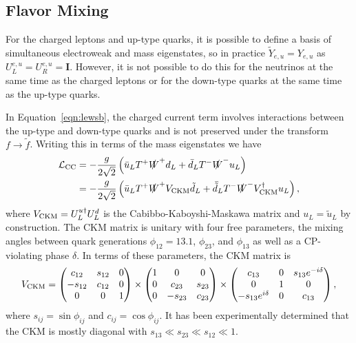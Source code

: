 \subsection{Flavor Mixing}

For the charged leptons and up-type quarks, it is possible to define a basis of simultaneous electroweak and mass eigenstates, so in practice $\tilde Y_{e,u} = Y_{e,u}$ as $U^{e,u}_L = U^{e,u}_R = \mathit{\mathbf{I}}$.
However, it is not possible to do this for the neutrinos at the same time as the charged leptons or for the down-type quarks at the same time as the up-type quarks.

In Equation~\ref{eqn:lewsb}, the charged current term involves interactions between the up-type and down-type quarks and is not preserved under the transform $f \rightarrow \tilde f$.
Writing this in terms of the mass eigenstates we have
\begin{align}
  \mathcal{L}_{\text{CC}} %
  & = - \frac{g}{2\sqrt{2}} \left( \bar u_L T^+ \slashed W^+ d_L + \bar d_L T^- \slashed W^- u_L \right) \nonumber \\
  & = - \frac{g}{2\sqrt{2}} \left( \bar{u}_L  T^+ \slashed W^+ \vckm \tilde{d}_L + \bar{\tilde{d}}_L T^- \slashed W^- \vckm^\dagger u_L \right),
\end{align}
where $V_{\text{CKM}} = U^{u\dagger}_L U^d_L$ is the Cabibbo-Kaboyshi-Maskawa matrix and $u_L = \tilde{u}_L$ by construction.
The CKM matrix is unitary with four free parameters, the mixing angles between quark generations $\phi_{12} = 13.1$, $\phi_{23}$, and $\phi_{13}$ as well as a CP-violating phase $\delta$.
In terms of these parameters, the CKM matrix is
\begin{equation}
  V_{\text{CKM}} = \begin{pmatrix} c_{12} & s_{12} & 0 \\ - s_{12} & c_{12} & 0 \\ 0 & 0 & 1 \end{pmatrix}
  \times \begin{pmatrix} 1 & 0 & 0  \\ 0 & c_{23} & s_{23} \\ 0 & - s_{23} & c_{23} \end{pmatrix}
  \times \begin{pmatrix} c_{13} & 0 & s_{13} e^{-i\delta} \\ 0 & 1 & 0 \\ -s_{13} e^{i\delta} & 0 & c_{13} \end{pmatrix},
\end{equation}
where $s_{ij} = \sin \phi_{ij}$ and $c_{ij} = \cos \phi_{ij}$.
It has been experimentally determined that the CKM is mostly diagonal with $s_{13} \ll s_{23} \ll s_{12} \ll 1$. 

